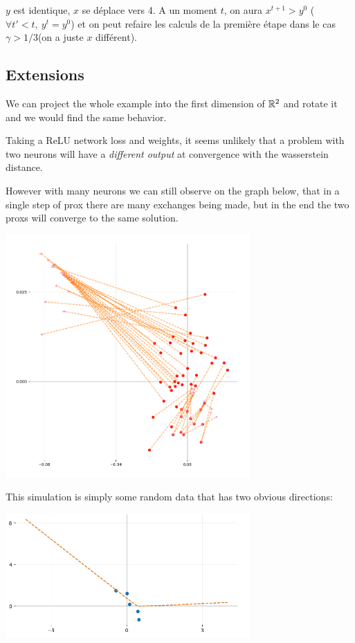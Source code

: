 $y$ est identique, $x$ se déplace vers 4. A un moment $t$, on aura $x^{t+1} > y^{0}$ ($\forall t' < t, \ y^t = y^0$) et on peut refaire les calculs de la première étape dans le cas $\gamma > 1/3$(on a juste $x$ différent).

\subsection{Extensions}

We can project the whole example into the first dimension of $\mathbb{R}^2$ and rotate it and we would find the same behavior.

Taking a ReLU network loss and weights, it seems unlikely that a problem with two neurons will have a \emph{different output} at convergence with the wasserstein distance.

However with many neurons we can still observe on the graph below, that in a single step of prox there are many exchanges being made, but in the end the two proxs will converge to the same solution.

\includegraphics[width=0.7\textwidth]{imgs/graph_onlypositives.png}

This simulation is simply some random data that has two obvious directions:

\includegraphics[width=0.7\textwidth]{imgs/graph_onlypositives_data.png}

